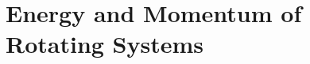 \documentclass[../mech.tex]{subfiles}
\begin{document}
\chapter{Energy and Momentum of Rotating Systems}
\end{document}
